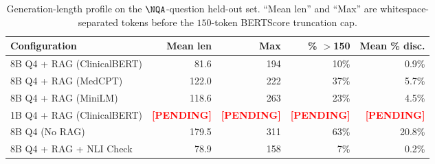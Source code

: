 \begin{table}[t]
\centering
\caption{Generation-length profile on the $\NQA$-question held-out
set. ``Mean len'' and ``Max'' are whitespace-separated tokens before
the $150$-token BERTScore truncation cap.}
\label{tab:gen_lengths}
\setlength{\tabcolsep}{4pt}
\begin{tabular}{@{}lrrrr@{}}
\toprule
\textbf{Configuration} & \textbf{Mean len} & \textbf{Max} & \textbf{\% $>$150} & \textbf{Mean \% disc.} \\
\midrule
8B Q4 + RAG (ClinicalBERT) & 81.6 & 194 & 10\% & 0.9\% \\
8B Q4 + RAG (MedCPT) & 122.0 & 222 & 37\% & 5.7\% \\
8B Q4 + RAG (MiniLM) & 118.6 & 263 & 23\% & 4.5\% \\
1B Q4 + RAG (ClinicalBERT) & \textcolor{red}{\textbf{[PENDING]}} & \textcolor{red}{\textbf{[PENDING]}} & \textcolor{red}{\textbf{[PENDING]}} & \textcolor{red}{\textbf{[PENDING]}} \\
8B Q4 (No RAG) & 179.5 & 311 & 63\% & 20.8\% \\
8B Q4 + RAG + NLI Check & 78.9 & 158 & 7\% & 0.2\% \\
\bottomrule
\end{tabular}
\end{table}

